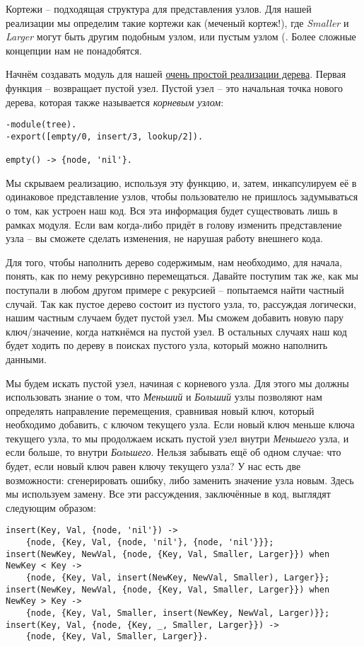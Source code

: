 Кортежи \--- подходящая структура для представления узлов.
Для нашей реализации мы определим такие кортежи как  (меченый кортеж!), где \emph{Smaller} и \emph{Larger} могут быть другим подобным узлом, или пустым узлом (.
Более сложные концепции нам не понадобятся.

Начнём создавать модуль для нашей \href{http://learnyousomeerlang.com/static/erlang/tree.erl}{очень простой реализации дерева}.
Первая функция  \--- возвращает пустой узел.
Пустой узел \--- это начальная точка нового дерева, которая также называется \emph{корневым узлом}:
\begin{lstlisting}[style=erlang]
-module(tree).
-export([empty/0, insert/3, lookup/2]).
 
empty() -> {node, 'nil'}.
\end{lstlisting}

Мы скрываем реализацию, используя эту функцию, и, затем, инкапсулируем её в одинаковое представление узлов, чтобы пользователю не пришлось задумываться о том, как устроен наш код.
Вся эта информация будет существовать лишь в рамках модуля.
Если вам когда\--либо придёт в голову изменить представление узла \--- вы сможете сделать изменения, не нарушая работу внешнего кода.

Для того, чтобы наполнить дерево содержимым, нам необходимо, для начала, понять, как по нему рекурсивно перемещаться.
Давайте поступим так же, как мы поступали в любом другом примере с рекурсией \--- попытаемся найти частный случай.
Так как пустое дерево состоит из пустого узла, то, рассуждая логически, нашим частным случаем будет пустой узел.
Мы сможем добавить новую пару ключ/значение, когда наткнёмся на пустой узел.
В остальных случаях наш код будет ходить по дереву в поисках пустого узла, который можно наполнить данными.

Мы будем искать пустой узел, начиная с корневого узла.
Для этого мы должны использовать знание о том, что \emph{Меньший} и \emph{Больший} узлы позволяют нам определять направление перемещения, сравнивая новый ключ, который необходимо добавить, с ключом текущего узла.
Если новый ключ меньше ключа текущего узла, то мы продолжаем искать пустой узел внутри \emph{Меньшего} узла, и если больше, то внутри \emph{Большего}.
Нельзя забывать ещё об одном случае: что будет, если новый ключ равен ключу текущего узла?
У нас есть две возможности: сгенерировать ошибку, либо заменить значение узла новым.
Здесь мы используем замену.
Все эти рассуждения, заключённые в код, выглядят следующим образом:
\begin{lstlisting}[style=erlang]
insert(Key, Val, {node, 'nil'}) ->
    {node, {Key, Val, {node, 'nil'}, {node, 'nil'}}};
insert(NewKey, NewVal, {node, {Key, Val, Smaller, Larger}}) when NewKey < Key ->
    {node, {Key, Val, insert(NewKey, NewVal, Smaller), Larger}};
insert(NewKey, NewVal, {node, {Key, Val, Smaller, Larger}}) when NewKey > Key ->
    {node, {Key, Val, Smaller, insert(NewKey, NewVal, Larger)}};
insert(Key, Val, {node, {Key, _, Smaller, Larger}}) ->
    {node, {Key, Val, Smaller, Larger}}.
\end{lstlisting}

